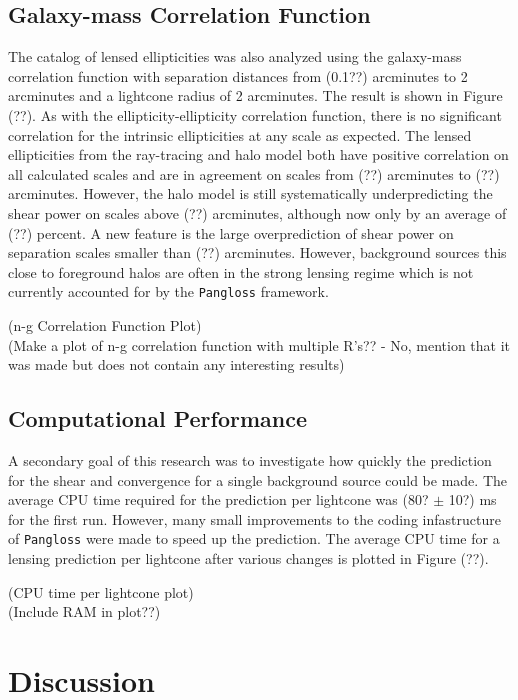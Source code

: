 \documentclass[%
 reprint,
 amsmath,amssymb,
 aps,
]{revtex4-1}
\begin{document}
\subsection*{Galaxy-mass Correlation Function}

The catalog of lensed ellipticities was also analyzed using the galaxy-mass correlation function with separation distances from (0.1??) arcminutes to 2 arcminutes and a lightcone radius of 2 arcminutes. The result is shown in Figure (??). As with the ellipticity-ellipticity correlation function, there is no significant correlation for the intrinsic ellipticities at any scale as expected. The lensed ellipticities from the ray-tracing and halo model both have positive correlation on all calculated scales and are in agreement on scales from (??) arcminutes to (??) arcminutes. However, the halo model is still systematically underpredicting the shear power on scales above (??) arcminutes, although now only by an average of (??) percent. A new feature is the large overprediction of shear power on separation scales smaller than (??) arcminutes. However, background sources this close to foreground halos are often in the strong lensing regime which is not currently accounted for by the \texttt{Pangloss} framework.

(n-g Correlation Function Plot)\\
(Make a plot of n-g correlation function with multiple R's?? - No, mention that it was made but does not contain any interesting results)

\subsection*{Computational Performance}

A secondary goal of this research was to investigate how quickly the prediction for the shear and convergence for a single background source could be made. The average CPU time required for the prediction per lightcone was (80? $\pm$ 10?) ms for the first run. However, many small improvements to the coding infastructure of \texttt{Pangloss} were made to speed up the prediction. The average CPU time for a lensing prediction per lightcone after various changes is plotted in Figure (??).

(CPU time per lightcone plot)\\
(Include RAM in plot??)

\section{Discussion}
\end{document}
